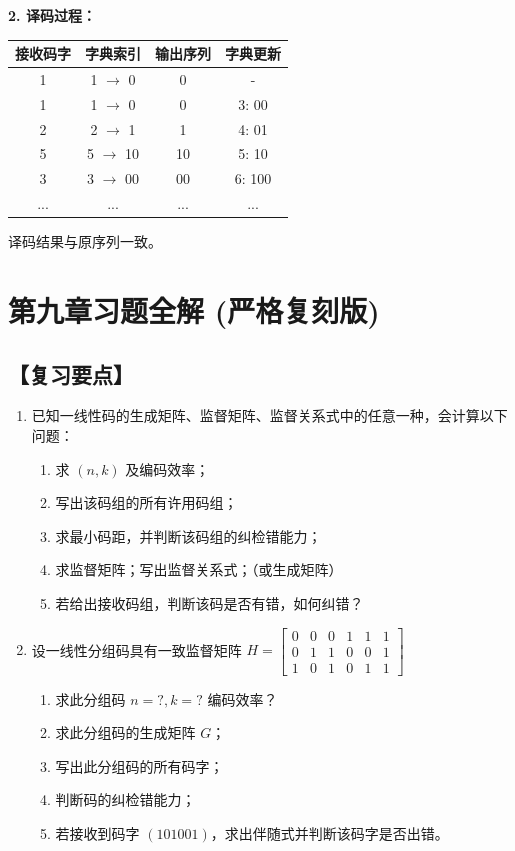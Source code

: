 \documentclass[11pt, a4paper]{article}
\begin{document}
\textbf{2. 译码过程：}
\begin{table}[h]
\centering
\small
\begin{tabular}{c|c|c|c}
\toprule
接收码字 & 字典索引 & 输出序列 & 字典更新 \\
\midrule
1 & 1 $\to$ 0 & 0 & - \\
1 & 1 $\to$ 0 & 0 & 3: 00 \\
2 & 2 $\to$ 1 & 1 & 4: 01 \\
5 & 5 $\to$ 10 & 10 & 5: 10 \\
3 & 3 $\to$ 00 & 00 & 6: 100 \\
... & ... & ... & ... \\
\bottomrule
\end{tabular}
\end{table}
译码结果与原序列一致。

\section{第九章习题全解 (严格复刻版)}

\subsection*{【复习要点】}
\begin{enumerate}
    \item 已知一线性码的生成矩阵、监督矩阵、监督关系式中的任意一种，会计算以下问题：
    \begin{enumerate}
        \item 求 $(n, k)$ 及编码效率；
        \item 写出该码组的所有许用码组；
        \item 求最小码距，并判断该码组的纠检错能力；
        \item 求监督矩阵；写出监督关系式；（或生成矩阵）
        \item 若给出接收码组，判断该码是否有错，如何纠错？
    \end{enumerate}
    
    \item 设一线性分组码具有一致监督矩阵 $H = \begin{bmatrix} 0 & 0 & 0 & 1 & 1 & 1 \\ 0 & 1 & 1 & 0 & 0 & 1 \\ 1 & 0 & 1 & 0 & 1 & 1 \end{bmatrix}$
    \begin{enumerate}
        \item 求此分组码 $n=?, k=?$ 编码效率？
        \item 求此分组码的生成矩阵 $G$；
        \item 写出此分组码的所有码字；
        \item 判断码的纠检错能力；
        \item 若接收到码字 $(101001)$，求出伴随式并判断该码字是否出错。
    \end{enumerate}
\end{enumerate}
\end{document}
